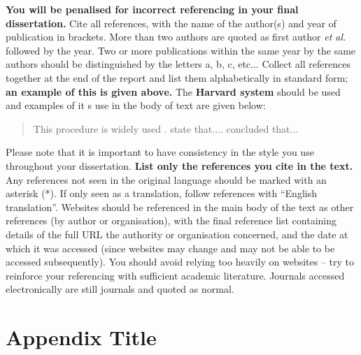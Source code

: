 \documentclass{article}
\begin{document}



\vspace*{10mm}

\textbf{You will be penalised for incorrect referencing in your final dissertation.} Cite all references, with the name of the author(s) and year of publication in brackets. More than
two authors are quoted as first author \textit{et al.} followed by the year.  Two or more publications within
the same year by the same authors should be distinguished by the letters a, b, c, etc... Collect all
references together at the end of the report and list them alphabetically in standard form; \textbf{an
example of this is given above.} The \textbf{Harvard system} should be used and examples of it s use in the body of text are given below:


\begin{quote}
This procedure is widely used \citep{Christou2009,Wu2016,Hughes2016a,Hughes2016b}. \citet{Christou2014} state that.... \citet{Spinneken2009a,Spinneken2009b} concluded that...
\end{quote}


Please note that it is important to have consistency in the style you use throughout your dissertation. \textbf{List only the references you cite in the text.} Any references not seen in the original language should be marked with an asterisk (*). If only seen as a translation, follow references with ``English translation''. Websites should be referenced in the main body of the text as other references (by author or organisation), with the final reference list containing details of the full URL the authority or organisation concerned, and the date at which it was accessed (since websites may change and may not be able to be accessed subsequently). You should avoid relying too heavily on websites -- try to reinforce your referencing with sufficient academic literature. Journals accessed electronically are still journals and quoted as normal.







\section{Appendix Title}
\label{sec:appendix}
\end{document}

